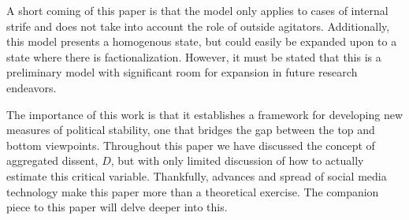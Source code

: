 \documentclass[12pt]{article}
\begin{document}
\begin{spacing}{1.5}
A short coming of this paper is that the model only applies to cases of internal strife and does not take into account the role of outside agitators. Additionally, this model presents a homogenous state, but could easily be expanded upon to a state where there is factionalization. However, it must be stated that this is a preliminary model with significant room for expansion in future research endeavors.

The importance of this work is that it establishes a framework for developing new measures of political stability, one that bridges the gap between the top and bottom viewpoints. Throughout this paper we have discussed the concept of aggregated dissent, $D$, but with only limited discussion of how to actually estimate this critical variable. Thankfully, advances and spread of social media technology make this paper more than a theoretical exercise. The companion piece to this paper will delve deeper into this.   

\end{spacing}


\pagebreak




\nocite{*}
\end{document}
